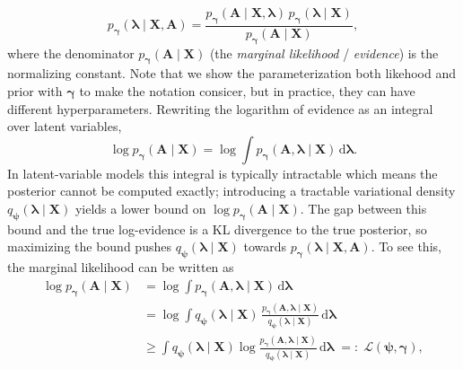 \begin{equation}
p_{\boldsymbol{\gamma}}(\boldsymbol{\lambda}\mid \mathbf{X},\mathbf{A})
=
\frac{p_{\boldsymbol{\gamma}}(\mathbf{A}\mid \mathbf{X},\boldsymbol{\lambda})\,p_{\boldsymbol{\gamma}}(\boldsymbol{\lambda}\mid \mathbf{X})}
     {p_{\boldsymbol{\gamma}}(\mathbf{A}\mid \mathbf{X})},
\label{eq:bayes-posterior}
\end{equation}
where the denominator
\(
p_{\boldsymbol{\gamma}}(\mathbf{A}\mid \mathbf{X})
\)
(the \emph{marginal likelihood} / \emph{evidence}) is the normalizing constant. Note that 
we show the parameterization both likehood and prior with $\boldsymbol{\gamma}$ to make the 
notation consicer, but in practice, they can have different hyperparameters.
Rewriting the logarithm of evidence as an 
integral over latent variables,  
\begin{equation}
\log p_{\boldsymbol{\gamma}}(\mathbf{A}\mid \mathbf{X}) = \log \int p_{\boldsymbol{\gamma}}(\mathbf{A},\boldsymbol{\lambda}\mid \mathbf{X})\,\mathrm{d}\boldsymbol{\lambda}.
\end{equation}
In latent-variable models this integral is typically intractable which means the 
posterior cannot be computed exactly; introducing a tractable variational density \(q_{\boldsymbol{\psi}}(\boldsymbol{\lambda}\mid \mathbf{X})\) 
yields a lower bound on \(\log p_{\boldsymbol{\gamma}}(\mathbf{A}\mid\mathbf{X})\). 
The gap between this bound and the true log-evidence is a KL divergence to the true posterior, 
so maximizing the bound pushes \(q_{\boldsymbol{\psi}}(\boldsymbol{\lambda}\mid \mathbf{X})\) 
towards \(p_{\boldsymbol{\gamma}}(\boldsymbol{\lambda}\mid \mathbf{X},\mathbf{A})\). To see this, 
the marginal likelihood can be written as
\begin{align}
\log p_{\boldsymbol{\gamma}}(\mathbf{A}\mid \mathbf{X})
&= \log \int p_{\boldsymbol{\gamma}}(\mathbf{A},\boldsymbol{\lambda}\mid \mathbf{X})\,\mathrm{d}\boldsymbol{\lambda}
\nonumber\\
&= \log \int q_{\boldsymbol{\psi}}(\boldsymbol{\lambda}\mid \mathbf{X})\,
\frac{p_{\boldsymbol{\gamma}}(\mathbf{A},\boldsymbol{\lambda}\mid \mathbf{X})}{q_{\boldsymbol{\psi}}(\boldsymbol{\lambda}\mid \mathbf{X})}\,
\mathrm{d}\boldsymbol{\lambda}
\nonumber\\
&\ge \int q_{\boldsymbol{\psi}}(\boldsymbol{\lambda}\mid \mathbf{X})
\log\frac{p_{\boldsymbol{\gamma}}(\mathbf{A},\boldsymbol{\lambda}\mid \mathbf{X})}{q_{\boldsymbol{\psi}}(\boldsymbol{\lambda}\mid \mathbf{X})}\,
\mathrm{d}\boldsymbol{\lambda}
\;=:\; \mathcal{L}(\boldsymbol{\psi},\boldsymbol{\gamma}),
\label{eq:elbo-def}
\end{align}
